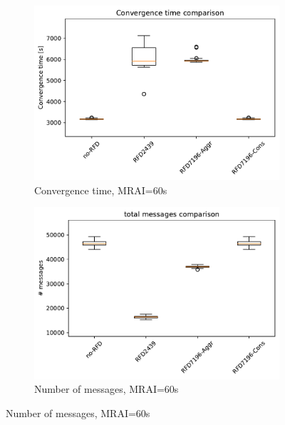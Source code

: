 \begin{figure}[H]
     \vfill
     \begin{subfigure}[b]{0.325\textwidth}
         \centering
         \includegraphics[width=\textwidth]{images/RFD/miceVSelephants/MultiMRAI/60/mice/cisco_1000MRAI60_rfd_comparison_time_boxplot.pdf}
         \caption{\scriptsize Convergence time, MRAI=60s}
         \label{fig:1000_RFD_MRAI60_time_mice}
     \end{subfigure}
     \hfill
     \begin{subfigure}[b]{0.325\textwidth}
         \centering
         \includegraphics[width=\textwidth]{images/RFD/miceVSelephants/MultiMRAI/60/mice/cisco_1000MRAI60_rfd_comparison_messages_boxplot.pdf}
         \caption{\scriptsize Number of messages, MRAI=60s}
         \label{fig:1000_RFD_MRAI60_messages_mice}
     \end{subfigure}

\end{figure}
